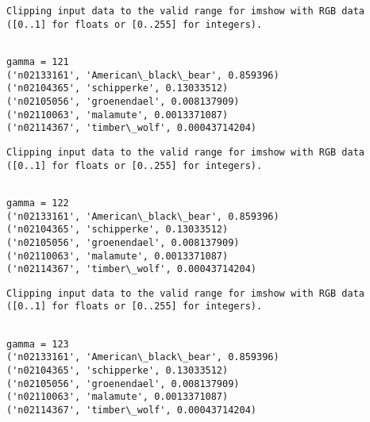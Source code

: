 \documentclass[11pt]{article}
\begin{document}
    \begin{Verbatim}[commandchars=\\\{\}]
Clipping input data to the valid range for imshow with RGB data ([0..1] for floats or [0..255] for integers).

    \end{Verbatim}

    \begin{Verbatim}[commandchars=\\\{\}]

gamma = 121
('n02133161', 'American\_black\_bear', 0.859396)
('n02104365', 'schipperke', 0.13033512)
('n02105056', 'groenendael', 0.008137909)
('n02110063', 'malamute', 0.0013371087)
('n02114367', 'timber\_wolf', 0.00043714204)

    \end{Verbatim}

    \begin{Verbatim}[commandchars=\\\{\}]
Clipping input data to the valid range for imshow with RGB data ([0..1] for floats or [0..255] for integers).

    \end{Verbatim}

    \begin{Verbatim}[commandchars=\\\{\}]

gamma = 122
('n02133161', 'American\_black\_bear', 0.859396)
('n02104365', 'schipperke', 0.13033512)
('n02105056', 'groenendael', 0.008137909)
('n02110063', 'malamute', 0.0013371087)
('n02114367', 'timber\_wolf', 0.00043714204)

    \end{Verbatim}

    \begin{Verbatim}[commandchars=\\\{\}]
Clipping input data to the valid range for imshow with RGB data ([0..1] for floats or [0..255] for integers).

    \end{Verbatim}

    \begin{Verbatim}[commandchars=\\\{\}]

gamma = 123
('n02133161', 'American\_black\_bear', 0.859396)
('n02104365', 'schipperke', 0.13033512)
('n02105056', 'groenendael', 0.008137909)
('n02110063', 'malamute', 0.0013371087)
('n02114367', 'timber\_wolf', 0.00043714204)

    \end{Verbatim}
\end{document}
